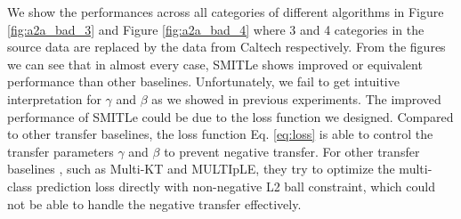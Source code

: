 We show the performances across all categories of different algorithms in Figure \eqref{fig:a2a_bad_3} and Figure \eqref{fig:a2a_bad_4} where 3 and 4 categories in the source data are replaced by the data from Caltech respectively. From the figures we can see that in almost every case, SMITLe shows improved or equivalent performance than other baselines. Unfortunately, we fail to get intuitive interpretation for $\gamma$ and $\beta$ as we showed in previous experiments. The improved performance of SMITLe could be due to the loss function we designed. Compared to other transfer baselines, the loss function Eq. \eqref{eq:loss} is able to control the transfer parameters $\gamma$ and $\beta$ to prevent negative transfer. For other transfer baselines , such as Multi-KT and MULTIpLE, they try to optimize the multi-class prediction loss directly with non-negative L2 ball constraint, which could not be able to handle the negative transfer effectively.



